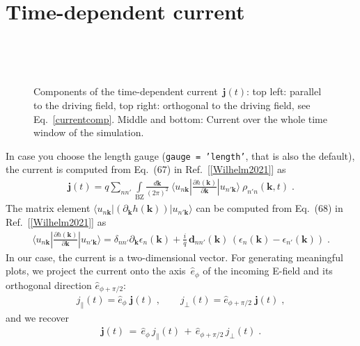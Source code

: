 \documentclass[11pt, a4paper]{scrartcl}
\newlength\figureheight
\newlength\figurewidth
\newcommand{\bk}{\mathbf{k}}
\newcommand{\bj}{\mathbf{j}}
\newcommand{\bd}{\mathbf{d}}
\newcommand{\eqt}{\,{=}\,}
\newcommand{\pt}{\,{+}\,}
\newcommand{\intbzdkpi}{\int\limits_\text{BZ}\frac{d\bk}{(2\pi)^2}}
\newcommand{\rhonprimen}{\rho_{n'n}(\bk,t)}
\begin{document}
\section{Time-dependent current}
\begin{figure}
\centering
\setlength\figureheight{7.5cm} 
\setlength\figurewidth{7.5cm}
\hfill
\\
\setlength\figureheight{6.5cm} 
\setlength\figurewidth{\textwidth}

\\

\caption{Components of the time-dependent current~$\bj(t)$: top left: parallel to the driving field, top right: orthogonal to the driving field, see Eq.~\eqref{currentcomp}.
Middle and bottom: Current over the whole time window of the simulation. }
    \label{fig:current}
\end{figure}
In case you choose the length gauge (\texttt{gauge = 'length'}, that is also the default), the current is computed from Eq.~(67) in Ref.~[\ref{Wilhelm2021}] as
\begin{align}
 \bj(t)  =
q\sum_{nn'} \intbzdkpi
\ \langle u_{n\bk} |  \frac{\partial h(\bk)}{\partial \bk} | u_{n'\bk}\rangle \ \rhonprimen\;.\label{current}
\end{align} 
The matrix element $ \langle u_{n\bk} |  (\partial_\bk h(\bk)) | u_{n'\bk}\rangle$ can be computed from Eq.~(68) in Ref.~[\ref{Wilhelm2021}] as
\begin{align}
   \langle u_{n\bk} |  \frac{\partial h(\bk)}{\partial \bk} | u_{n'\bk}\rangle  = \delta_{nn'}\partial_\bk\epsilon_n(\bk) 
   +\frac{i}{q}\, \bd_{nn'}(\bk)\,(\epsilon_n(\bk)-\epsilon_{n'}(\bk)) \;.
\end{align}
%
In our case, the current is a two-dimensional vector. 
%
For generating meaningful plots, we project the current onto the axis~$\hat{e}_\phi$ of the incoming E-field and its orthogonal direction $\hat{e}_{\phi+\pi/2}$:
\begin{align}
    j_{\parallel}(t) = \hat{e}_\phi\;\bj(t)\;,\hspace{2em}
    j_{\bot}(t) = \hat{e}_{\phi+\pi/2}\;\bj(t)\;, 
    \label{currentcomp}
\end{align}
and we recover 
\begin{align}
\bj(t)\eqt\hat{e}_\phi\, j_{\parallel}(t)\pt\hat{e}_{\phi+\pi/2}\,j_{\bot}(t)\;.
    \label{currentdecomp}
\end{align}
\end{document}
